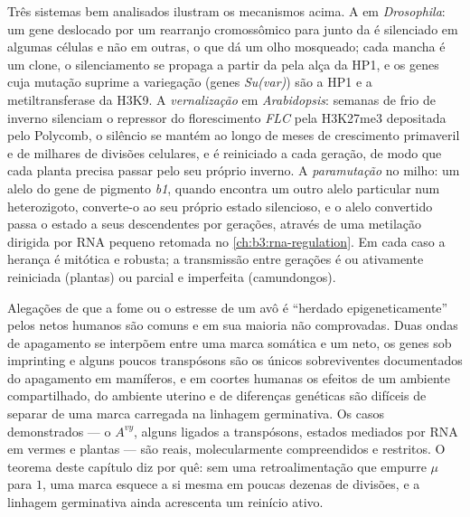 \begin{proposition}\label{prop:b3:chromatin-epigenetics:examples}
Três sistemas bem analisados ilustram os mecanismos acima. A
\emph{} em \emph{Drosophila}: um gene
deslocado por um rearranjo cromossômico para junto da 
é silenciado em algumas células e não em outras, o que dá um olho
mosqueado; cada mancha é um clone, o silenciamento se propaga a partir
da  pela alça da HP1, e os genes cuja mutação suprime a
variegação (genes \emph{Su(var)}) são a HP1 e a metiltransferase da
H3K9. A \emph{vernalização} em \emph{Arabidopsis}: semanas de frio de
inverno silenciam o repressor do florescimento \emph{FLC} pela
H3K27me3 depositada pelo Polycomb, o silêncio se mantém ao longo de
meses de crescimento primaveril e de milhares de divisões celulares, e
é reiniciado a cada geração, de modo que cada planta precisa passar
pelo seu próprio inverno. A \emph{paramutação} no milho: um alelo do
gene de pigmento \emph{b1}, quando encontra um outro alelo particular
num heterozigoto, converte-o ao seu próprio estado silencioso, e o
alelo convertido passa o estado a seus descendentes por gerações,
através de uma metilação dirigida por RNA pequeno retomada no
\cref{ch:b3:rna-regulation}. Em cada caso a herança é mitótica e
robusta; a transmissão entre gerações é ou ativamente reiniciada
(plantas) ou parcial e imperfeita (camundongos).
\end{proposition}

\begin{remark}\label{rem:b3:chromatin-epigenetics:limits}
Alegações de que a fome ou o estresse de um avô é ``herdado
epigeneticamente'' pelos netos humanos são comuns e em sua maioria não
comprovadas. Duas ondas de apagamento se interpõem entre uma marca
somática e um neto, os genes sob imprinting e alguns poucos
transpósons são os únicos sobreviventes documentados do apagamento em
mamíferos, e em coortes humanas os efeitos de um ambiente
compartilhado, do ambiente uterino e de diferenças genéticas são
difíceis de separar de uma marca carregada na linhagem germinativa. Os
casos demonstrados --- o $A^{vy}$, alguns  ligados a
transpósons, estados mediados por RNA em vermes e plantas --- são
reais, molecularmente compreendidos e restritos. O teorema deste
capítulo diz por quê: sem uma retroalimentação que empurre $\mu$ para
$1$, uma marca esquece a si mesma em poucas dezenas de divisões, e a
linhagem germinativa ainda acrescenta um reinício ativo.
\end{remark}

